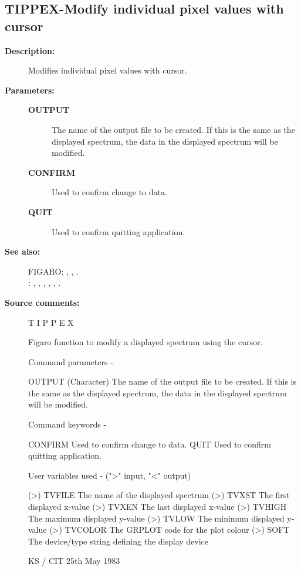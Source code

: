 \subsection{TIPPEX-\label{TIPPEX}Modify individual pixel values with cursor}
\begin{description}

\item [\textbf{Description:}]
 Modifies individual pixel values with cursor.

\item [\textbf{Parameters:}]
\begin{description}
\item [\textbf{OUTPUT}]
 The name of the output file to be created.  If this is the same as
 the displayed spectrum, the data in the displayed spectrum will be
 modified.
\item [\textbf{CONFIRM}]
 Used to confirm change to data.
\item [\textbf{QUIT}]
 Used to confirm quitting application.
\end{description}

\item [\textbf{See also:}]
FIGARO: , , .\\
: , , , , , .\\

\item [\textbf{Source comments:}]
\begin{terminalv}
 T I P P E X

 Figaro function to modify a displayed spectrum using the
 cursor.

 Command parameters -

 OUTPUT      (Character) The name of the output file to
             be created.  If this is the same as the displayed
             spectrum, the data in the displayed spectrum will
             be modified.

 Command keywords -

 CONFIRM     Used to confirm change to data.
 QUIT        Used to confirm quitting application.

 User variables used -  (">" input, "<" output)

 (>) TVFILE  The name of the displayed spectrum
 (>) TVXST   The first displayed x-value
 (>) TVXEN   The last displayed x-value
 (>) TVHIGH  The maximum displayed y-value
 (>) TVLOW   The minimum displayed y-value
 (>) TVCOLOR The GRPLOT code for the plot colour
 (>) SOFT    The device/type string defining the display device

                                          KS / CIT 25th May 1983
\end{terminalv}
\end{description}
